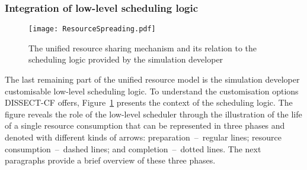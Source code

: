 \documentclass[sort, compress, 5p]{elsarticle}
\begin{document}
\subsubsection{Integration of low-level scheduling logic}

\begin{figure}[tb]
\centering
\texttt{[image: ResourceSpreading.pdf]}
\caption{The unified resource sharing mechanism and its relation to the scheduling logic provided by the simulation developer\label{FIG-RS}}
\end{figure}

The last remaining part of the unified resource model is the simulation developer customisable low-level scheduling logic. To understand the customisation options DISSECT-CF offers, Figure~\ref{FIG-RS} presents the context of the scheduling logic. The figure reveals the role of the low-level scheduler through the illustration of the life of a single resource consumption that can be represented in three phases and denoted with different kinds of arrows: preparation~--~regular lines; resource consumption~--~dashed lines; and completion~--~dotted lines. The next paragraphs provide a brief overview of these three phases.
\end{document}
